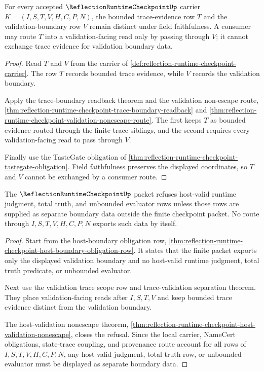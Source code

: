 \begin{theorem}
\label{thm:reflection-runtime-checkpoint-trace-validation-separation}
For every accepted $\ReflectionRuntimeCheckpointUp$ carrier $K=(I,S,T,V,H,C,P,N)$, the bounded trace-evidence row $T$ and the validation-boundary row $V$ remain distinct under field faithfulness. A consumer may route $T$ into a validation-facing read only by passing through $V$; it cannot exchange trace evidence for validation boundary data.
\end{theorem}
\begin{proof}
Read $T$ and $V$ from the carrier of \autoref{def:reflection-runtime-checkpoint-carrier}. The row $T$ records bounded trace evidence, while $V$ records the validation boundary.

Apply the trace-boundary readback theorem and the validation non-escape route, \autoref{thm:reflection-runtime-checkpoint-trace-boundary-readback} and \autoref{thm:reflection-runtime-checkpoint-validation-nonescape-route}. The first keeps $T$ as bounded evidence routed through the finite trace siblings, and the second requires every validation-facing read to pass through $V$.

Finally use the TasteGate obligation of \autoref{thm:reflection-runtime-checkpoint-tastegate-obligation}. Field faithfulness preserves the displayed coordinates, so $T$ and $V$ cannot be exchanged by a consumer route.
\end{proof}

\begin{theorem}
\label{thm:reflection-runtime-checkpoint-host-boundary-refusal}
The $\ReflectionRuntimeCheckpointUp$ packet refuses host-valid runtime judgment, total truth, and unbounded evaluator rows unless those rows are supplied as separate boundary data outside the finite checkpoint packet. No route through $I,S,T,V,H,C,P,N$ exports such data by itself.
\end{theorem}
\begin{proof}
Start from the host-boundary obligation row, \autoref{thm:reflection-runtime-checkpoint-host-boundary-obligation-row}. It states that the finite packet exports only the displayed validation boundary and no host-valid runtime judgment, total truth predicate, or unbounded evaluator.

Next use the validation trace scope row and trace-validation separation theorem. They place validation-facing reads after $I,S,T,V$ and keep bounded trace evidence distinct from the validation boundary.

The host-validation nonescape theorem, \autoref{thm:reflection-runtime-checkpoint-host-validation-nonescape}, closes the refusal. Since the local carrier, NameCert obligations, state-trace coupling, and provenance route account for all rows of $I,S,T,V,H,C,P,N$, any host-valid judgment, total truth row, or unbounded evaluator must be displayed as separate boundary data.
\end{proof}


